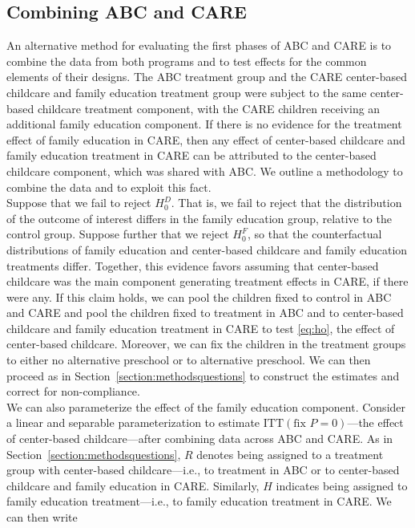 \subsection{Combining ABC and CARE}

\noindent An alternative method for evaluating the first phases of ABC and CARE is to combine the data from both programs and to test effects for the common elements of their designs. The ABC treatment group and the CARE center-based childcare and family education treatment group were subject to the same center-based childcare treatment component, with the CARE children receiving an additional family education component. If there is no evidence for the treatment effect of family education in CARE, then any effect of center-based childcare and family education treatment in CARE can be attributed to the center-based childcare component, which was shared with ABC. We outline a methodology to combine the data and to exploit this fact.\\

\noindent Suppose that we fail to reject $H_{0}^D$. That is, we fail to reject that the distribution of the outcome of interest differs in the family education group, relative to the control group. Suppose further that we reject $H_{0}^F$, so that the counterfactual distributions of family education and center-based childcare and family education treatments differ. Together, this evidence favors assuming that center-based childcare was the main component generating treatment effects in CARE, if there were any. If this claim holds, we can pool the children fixed to control in ABC and CARE and pool the children fixed to treatment in ABC and to center-based childcare and family education treatment in CARE to test \eqref{eq:ho}, the effect of center-based childcare. Moreover, we can fix the children in the treatment groups to either no alternative preschool or to alternative preschool. We can then proceed as in Section~\ref{section:methodsquestions} to construct the estimates and correct for non-compliance.\\

\noindent We can also parameterize the effect of the family education component. Consider a linear and separable parameterization to estimate $\text{ITT} \left( \text{fix } P = 0\right)$---the effect of center-based childcare---after combining data across ABC and CARE. As in Section~\ref{section:methodsquestions}, $R$ denotes being assigned to a treatment group with center-based childcare---i.e., to treatment in ABC or to center-based childcare and family education in CARE. Similarly, $H$ indicates being assigned to family education treatment---i.e., to family education treatment in CARE. We can then write 

